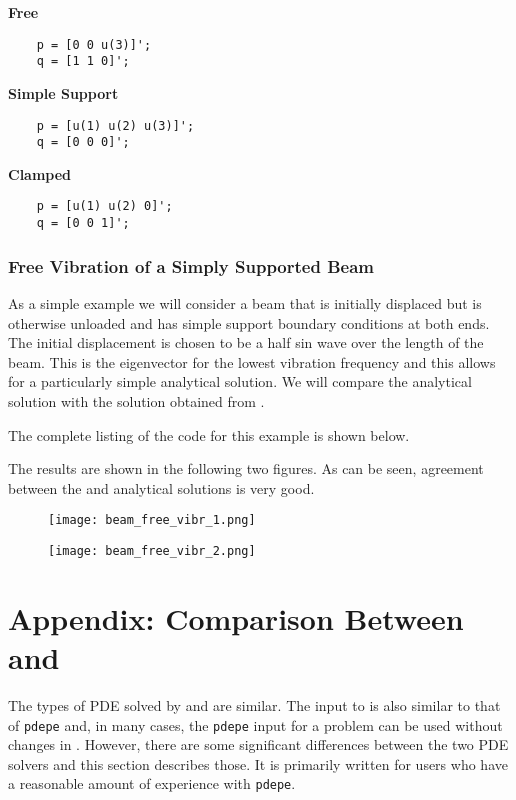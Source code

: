 \documentclass{article}
\begin{document}
\bigskip
{\bf Free}
\begin{lstlisting}
	p = [0 0 u(3)]';
	q = [1 1 0]';
\end{lstlisting}

{\bf Simple Support}
\begin{lstlisting}
	p = [u(1) u(2) u(3)]';
	q = [0 0 0]';
\end{lstlisting}

{\bf Clamped}
\begin{lstlisting}
	p = [u(1) u(2) 0]';
	q = [0 0 1]';
\end{lstlisting}

\subsubsection{Free Vibration of a Simply Supported Beam}
As a simple example we will consider a beam that is initially displaced but
is otherwise unloaded and has simple support boundary conditions at both ends.
The initial displacement is chosen to be a half sin wave over the length of the
beam. This is the eigenvector for the lowest vibration frequency and this
allows for a particularly simple analytical solution. We will compare the
analytical solution with the solution obtained from \pde.

The complete listing of the \ml code for this example is shown below.

The results are shown in the following two figures. As can be seen, agreement
between the \pde and analytical solutions is very good.

\begin{figure}[!h]
	\centering
	\texttt{[image: beam\_free\_vibr\_1.png]}
	\label{fig:beam_free_vibr_1}
\end{figure} 
\begin{figure}[!h]
	\centering
	\texttt{[image: beam\_free\_vibr\_2.png]}
	\label{fig:beam_free_vibr_2}
\end{figure} 

\newpage
\appendix
\section{Appendix: Comparison Between \pde and \ml \pdepe} \label{sec:pdepe} 
The types of PDE solved by \pde and  are similar. The input to \pde is
also similar to that of {\tt pdepe} and, in many cases, the  {\tt pdepe} input for a
problem can be used without changes in \pde. However, there are some significant differences
between the two PDE solvers and this section describes those. It is primarily written for users
who have a reasonable amount of experience with {\tt pdepe}.
\end{document}
